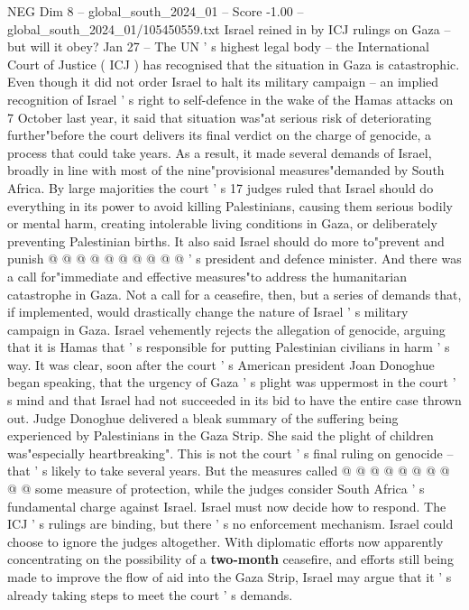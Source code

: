 \begin{textsample}{NEG Dim 8 – global\_south\_2024\_01 – Score -1.00 – global\_south\_2024\_01/105450559.txt}  \label{ex:f8_neg_173}
Israel reined in by ICJ rulings on Gaza -- but will it obey?
Jan 27 -- The UN ' s highest legal body -- the International Court of Justice ( ICJ ) has recognised that the situation in Gaza is catastrophic.
Even though it did not order Israel to halt its military campaign -- an implied recognition of Israel ' s right to self-defence in the wake of the Hamas attacks on 7 October last year, it said that situation was"at serious risk of deteriorating further"before the court delivers its final verdict on the charge of genocide, a process that could take years.
As a result, it made several demands of Israel, broadly in line with most of the nine"provisional measures"demanded by South Africa.
By large majorities the court ' s 17 judges ruled that Israel should do everything in its power to avoid killing Palestinians, causing them serious bodily or mental harm, creating intolerable living conditions in Gaza, or deliberately preventing Palestinian births.
It also said Israel should do more to"prevent and punish @ @ @ @ @ @ @ @ @ @ ' s president and defence minister.
And there was a call for"immediate and effective measures"to address the humanitarian catastrophe in Gaza.
Not a call for a ceasefire, then, but a series of demands that, if implemented, would drastically change the nature of Israel ' s military campaign in Gaza.
Israel vehemently rejects the allegation of genocide, arguing that it is Hamas that ' s responsible for putting Palestinian civilians in harm ' s way.
It was clear, soon after the court ' s American president Joan Donoghue began speaking, that the urgency of Gaza ' s plight was uppermost in the court ' s mind and that Israel had not succeeded in its bid to have the entire case thrown out.
Judge Donoghue delivered a bleak summary of the suffering being experienced by Palestinians in the Gaza Strip.
She said the plight of children was"especially heartbreaking".
This is not the court ' s final ruling on genocide -- that ' s likely to take several years.
But the measures called @ @ @ @ @ @ @ @ @ @ some measure of protection, while the judges consider South Africa ' s fundamental charge against Israel.
Israel must now decide how to respond.
The ICJ ' s rulings are binding, but there ' s no enforcement mechanism.
Israel could choose to ignore the judges altogether.
With diplomatic efforts now apparently concentrating on the possibility of a \textbf{two-month} ceasefire, and efforts still being made to improve the flow of aid into the Gaza Strip, Israel may argue that it ' s already taking steps to meet the court ' s demands.

\end{textsample}
